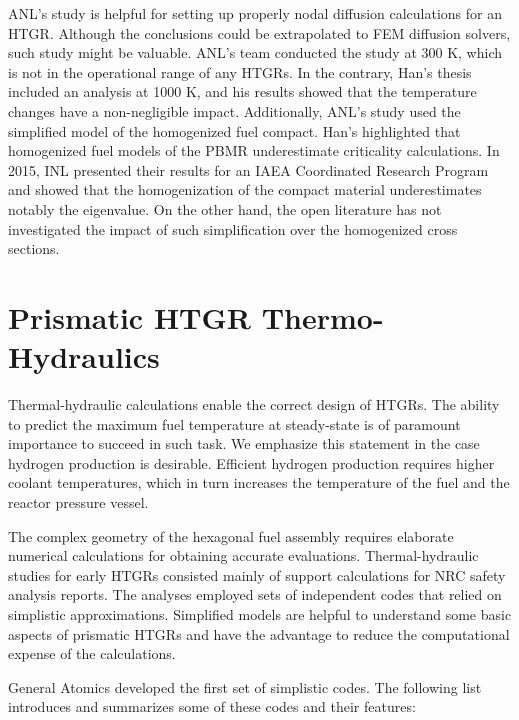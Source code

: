 \documentclass[11pt,letterpaper]{article}
\begin{document}
ANL's study is helpful for setting up properly nodal diffusion calculations for an \gls{HTGR}.
Although the conclusions could be extrapolated to \gls{FEM} diffusion solvers, such study might be valuable.
ANL's team conducted the study at 300 K, which is not in the operational range of any \glspl{HTGR}.
In the contrary, Han's thesis included an analysis at 1000 K, and his results showed that the temperature changes have a non-negligible impact.
Additionally, ANL's study used the simplified model of the homogenized fuel compact.
Han's highlighted that homogenized fuel models of the \gls{PBMR} underestimate criticality calculations.
In 2015, \gls{INL} presented their results \cite{strydom_results_2015} for an \gls{IAEA} Coordinated Research Program \cite{tyobeka_htgr_2011} and showed that the homogenization of the compact material underestimates notably the eigenvalue.
On the other hand, the open literature has not investigated the impact of such simplification over the homogenized cross sections.


\section{Prismatic \gls{HTGR} Thermo-Hydraulics}

Thermal-hydraulic calculations enable the correct design of \glspl{HTGR}.
The ability to predict the maximum fuel temperature at steady-state is of paramount importance to succeed in such task.
We emphasize this statement in the case hydrogen production is desirable.
Efficient hydrogen production requires higher coolant temperatures, which in turn increases the temperature of the fuel and the reactor pressure vessel.

The complex geometry of the hexagonal fuel assembly requires elaborate numerical calculations for obtaining accurate evaluations.
Thermal-hydraulic studies for early \glspl{HTGR} consisted mainly of support calculations for \gls{NRC} safety analysis reports.
The analyses employed sets of independent codes that relied on simplistic approximations.
Simplified models are helpful to understand some basic aspects of prismatic \glspl{HTGR} and have the advantage to reduce the computational expense of the calculations.

General Atomics \cite{shenoy_htgr_1974} developed the first set of simplistic codes.
The following list introduces and summarizes some of these codes and their features:
\end{document}

